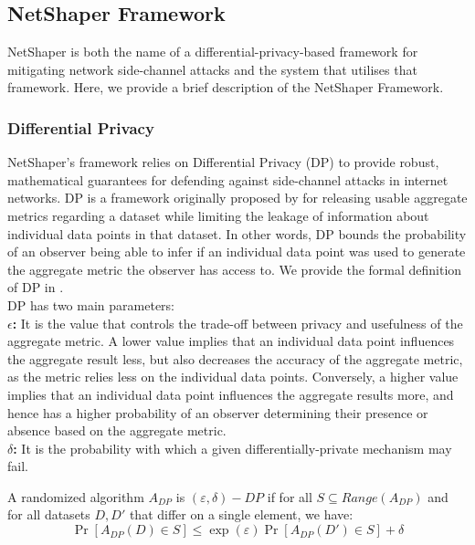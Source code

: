 \subsection{NetShaper Framework}
\label{subsec:netshaper-background-framework}

NetShaper \cite{sabzi2024netshaper} is both the name of a differential-privacy-based framework for mitigating network side-channel attacks and the system that utilises that framework. 
Here, we provide a brief description of the NetShaper Framework.

\subsubsection{Differential Privacy}
\label{subsubsec:netshaper-background-framework-dp}
NetShaper's framework relies on Differential Privacy (DP) to provide robust, mathematical guarantees for defending against side-channel attacks in internet networks.
DP is a framework originally proposed by \citet{dwork2006differential} for releasing usable aggregate metrics regarding a dataset while limiting the leakage of information about individual data points in that dataset.
In other words, DP bounds the probability of an observer being able to infer if an individual data point was used to generate the aggregate metric the observer has access to.
We provide the formal definition of DP in . \\
DP has two main parameters: \\
\textbf{$\epsilon$: } It is the value that controls the trade-off between privacy and usefulness of the aggregate metric.
A lower value implies that an individual data point influences the aggregate result less, but also decreases the accuracy of the aggregate metric, as the metric relies less on the individual data points.
Conversely, a higher value implies that an individual data point influences the aggregate results more, and hence has a higher probability of an observer determining their presence or absence based on the aggregate metric.\\
\textbf{$\delta$: } It is the probability with which a given differentially-private mechanism may fail.

\begin{definition}
  \label{def:dp}
  A randomized algorithm $A_{DP}$ is $(\varepsilon, \delta)-DP$ if for all ${S} \subseteq Range(A_{DP})$ and for all datasets $D, D'$ that differ on a single element, we have:
  \begin{equation*}
    \Pr[A_{DP}(D) \in S] \leq \exp(\varepsilon)\Pr[A_{DP}(D') \in S] + \delta
  \end{equation*}
\end{definition}

